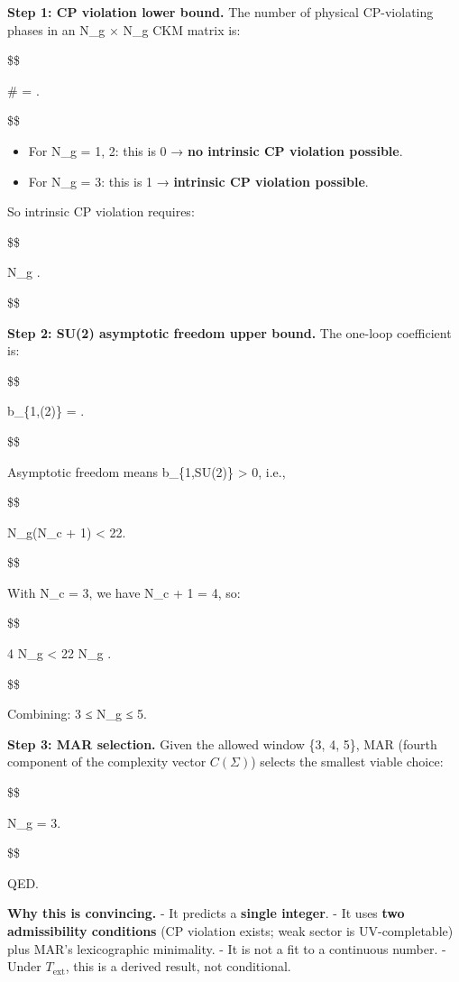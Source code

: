\documentclass[11pt,a4paper]{article}
\theoremstyle{remark}
\providecommand{\tightlist}{%
  \setlength{\itemsep}{0pt}\setlength{\parskip}{0pt}}
\begin{document}
\textbf{Step 1: CP violation lower bound.} The number of physical CP-violating
phases in an N\_g × N\_g CKM matrix is:

\$\$

\# = .

\$\$

\begin{itemize}
\tightlist
\item
  For N\_g = 1, 2: this is 0 → \textbf{no intrinsic CP violation possible}.
\item
  For N\_g = 3: this is 1 → \textbf{intrinsic CP violation possible}.
\end{itemize}

So intrinsic CP violation requires:

\$\$

N\_g .

\$\$

\textbf{Step 2: SU(2) asymptotic freedom upper bound.} The one-loop
coefficient is:

\$\$

b\_\{1,(2)\} = \left[22 - N_g(N_c + 1)\right].

\$\$

Asymptotic freedom means b\_\{1,SU(2)\} \textgreater{} 0, i.e.,

\$\$

N\_g(N\_c + 1) \textless{} 22.

\$\$

With N\_c = 3, we have N\_c + 1 = 4, so:

\$\$

4 N\_g \textless{} 22 \quad \Rightarrow \quad N\_g .

\$\$

Combining: 3 ≤ N\_g ≤ 5.

\textbf{Step 3: MAR selection.} Given the allowed window \{3, 4, 5\}, MAR
(fourth component of the complexity vector \(C(\Sigma)\)) selects the
smallest viable choice:

\$\$

N\_g = 3.

\$\$

QED.

\textbf{Why this is convincing.}
- It predicts a \textbf{single integer}.
- It uses \textbf{two admissibility conditions} (CP violation exists; weak
sector is UV-completable) plus MAR's lexicographic minimality.
- It is not a fit to a continuous number.
- Under \(T_{\mathrm{ext}}\), this is a derived result, not conditional.
\end{document}
